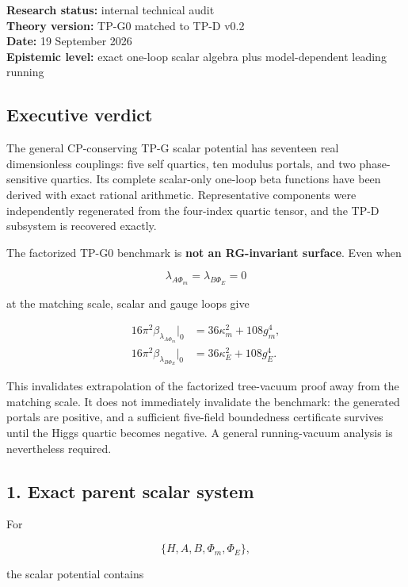 \documentclass[
]{article}
\begin{document}
\textbf{Research status:} internal technical audit\\
\textbf{Theory version:} TP-G0 matched to TP-D v0.2\\
\textbf{Date:} 19 September 2026\\
\textbf{Epistemic level:} exact one-loop scalar algebra plus
model-dependent leading running

\hypertarget{executive-verdict-4}{%
\subsection{Executive verdict}\label{executive-verdict-4}}

The general CP-conserving TP-G scalar potential has seventeen real
dimensionless couplings: five self quartics, ten modulus portals, and
two phase-sensitive quartics. Its complete scalar-only one-loop beta
functions have been derived with exact rational arithmetic.
Representative components were independently regenerated from the
four-index quartic tensor, and the TP-D subsystem is recovered exactly.

The factorized TP-G0 benchmark is \textbf{not an RG-invariant surface}.
Even when

\[
\lambda_{A\Phi_m}=\lambda_{B\Phi_E}=0
\]

at the matching scale, scalar and gauge loops give

\[
\begin{aligned}
16\pi^2\beta_{\lambda_{A\Phi_m}}\big|_0
 &=36\kappa_m^2+108g_m^4,\\
16\pi^2\beta_{\lambda_{B\Phi_E}}\big|_0
 &=36\kappa_E^2+108g_E^4.
\end{aligned}
\]

This invalidates extrapolation of the factorized tree-vacuum proof away
from the matching scale. It does not immediately invalidate the
benchmark: the generated portals are positive, and a sufficient
five-field boundedness certificate survives until the Higgs quartic
becomes negative. A general running-vacuum analysis is nevertheless
required.

\hypertarget{exact-parent-scalar-system}{%
\subsection{1. Exact parent scalar
system}\label{exact-parent-scalar-system}}

For

\[
\{H,A,B,\Phi_m,\Phi_E\},
\]

the scalar potential contains
\end{document}
